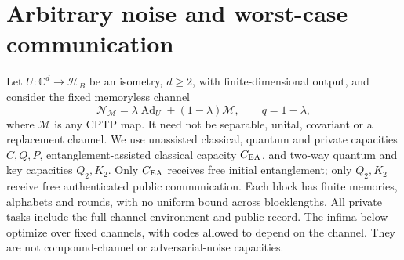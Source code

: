 \documentclass[11pt]{article}
\begin{document}
\section{Arbitrary noise and worst-case communication}\label{sec:minimax}
Let $U:\mathbb C^d\to\mathcal H_B$ be an isometry, $d\ge2$, with
finite-dimensional output, and consider the fixed memoryless channel
\[
 \mathcal N_{\mathcal M}=\lambda\operatorname{Ad}_U+(1-\lambda)\mathcal M,
 \qquad q=1-\lambda,
\]
where $\mathcal M$ is any CPTP map. It need not be separable, unital,
covariant or a replacement channel. We use unassisted classical,
quantum and private capacities $C,Q,P$, entanglement-assisted classical
capacity $C_{\rm EA}$, and two-way quantum and key capacities $Q_2,K_2$.
Only $C_{\rm EA}$ receives free initial entanglement; only $Q_2,K_2$
receive free authenticated public communication. Each block has finite
memories, alphabets and rounds, with no uniform bound across blocklengths.
All private tasks include the full channel environment and public record.
The infima below optimize over fixed channels, with codes allowed to
depend on the channel. They are not compound-channel or adversarial-noise
capacities.
\end{document}
